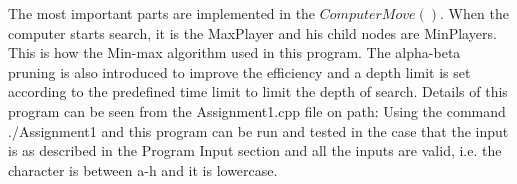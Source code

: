 \documentclass[a4paper, 11pt]{article}
\begin{document}
The most important parts are implemented in the $ComputerMove()$. When the computer starts search, it is the MaxPlayer and his child nodes are MinPlayers. This is how the Min-max algorithm used in this program. The alpha-beta pruning is also introduced to improve the efficiency and a depth limit is set according to the predefined time limit to limit the depth of search. Details of this program can be seen from the Assignment1.cpp file on path: Using the command ./Assignment1 and this program can be run and tested in the case that the input is as described in the Program Input section and all the inputs are valid, i.e. the character is between a-h and it is lowercase.
\end{document}
